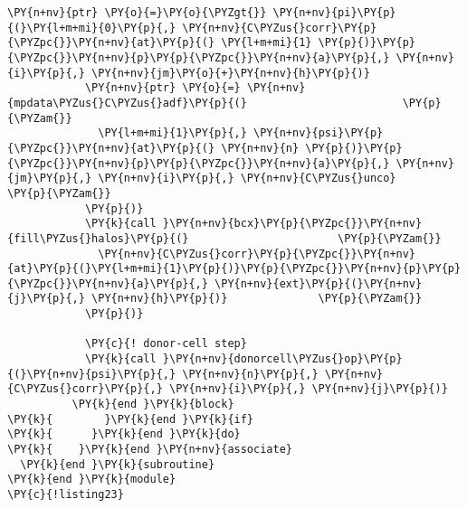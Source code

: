 \begin{Verbatim}[commandchars=\\\{\}]
            \PY{n+nv}{ptr} \PY{o}{=}\PY{o}{\PYZgt{}} \PY{n+nv}{pi}\PY{p}{(}\PY{l+m+mi}{0}\PY{p}{,} \PY{n+nv}{C\PYZus{}corr}\PY{p}{\PYZpc{}}\PY{n+nv}{at}\PY{p}{(} \PY{l+m+mi}{1} \PY{p}{)}\PY{p}{\PYZpc{}}\PY{n+nv}{p}\PY{p}{\PYZpc{}}\PY{n+nv}{a}\PY{p}{,} \PY{n+nv}{i}\PY{p}{,} \PY{n+nv}{jm}\PY{o}{+}\PY{n+nv}{h}\PY{p}{)}
            \PY{n+nv}{ptr} \PY{o}{=} \PY{n+nv}{mpdata\PYZus{}C\PYZus{}adf}\PY{p}{(}                        \PY{p}{\PYZam{}}
              \PY{l+m+mi}{1}\PY{p}{,} \PY{n+nv}{psi}\PY{p}{\PYZpc{}}\PY{n+nv}{at}\PY{p}{(} \PY{n+nv}{n} \PY{p}{)}\PY{p}{\PYZpc{}}\PY{n+nv}{p}\PY{p}{\PYZpc{}}\PY{n+nv}{a}\PY{p}{,} \PY{n+nv}{jm}\PY{p}{,} \PY{n+nv}{i}\PY{p}{,} \PY{n+nv}{C\PYZus{}unco}        \PY{p}{\PYZam{}}
            \PY{p}{)}
            \PY{k}{call }\PY{n+nv}{bcx}\PY{p}{\PYZpc{}}\PY{n+nv}{fill\PYZus{}halos}\PY{p}{(}                       \PY{p}{\PYZam{}}
              \PY{n+nv}{C\PYZus{}corr}\PY{p}{\PYZpc{}}\PY{n+nv}{at}\PY{p}{(}\PY{l+m+mi}{1}\PY{p}{)}\PY{p}{\PYZpc{}}\PY{n+nv}{p}\PY{p}{\PYZpc{}}\PY{n+nv}{a}\PY{p}{,} \PY{n+nv}{ext}\PY{p}{(}\PY{n+nv}{j}\PY{p}{,} \PY{n+nv}{h}\PY{p}{)}              \PY{p}{\PYZam{}}
            \PY{p}{)}

            \PY{c}{! donor-cell step}
            \PY{k}{call }\PY{n+nv}{donorcell\PYZus{}op}\PY{p}{(}\PY{n+nv}{psi}\PY{p}{,} \PY{n+nv}{n}\PY{p}{,} \PY{n+nv}{C\PYZus{}corr}\PY{p}{,} \PY{n+nv}{i}\PY{p}{,} \PY{n+nv}{j}\PY{p}{)} 
          \PY{k}{end }\PY{k}{block}
\PY{k}{        }\PY{k}{end }\PY{k}{if}
\PY{k}{      }\PY{k}{end }\PY{k}{do}
\PY{k}{    }\PY{k}{end }\PY{n+nv}{associate}
  \PY{k}{end }\PY{k}{subroutine}
\PY{k}{end }\PY{k}{module}
\PY{c}{!listing23}
\end{Verbatim}
